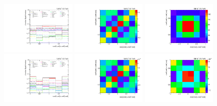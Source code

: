 \begin{figure}[htb]
\begin{center}
 \includegraphics[width=0.32\textwidth]{fig_fullRun2UL/unfolding/combined/deltaSystCombinedlog_rebinnedB_c_Pnk.pdf}
 \includegraphics[width=0.32\textwidth]{fig_fullRun2UL/unfolding/combined/StatCovMatrix_rebinnedB_c_Pnk.pdf}
 \includegraphics[width=0.32\textwidth]{fig_fullRun2UL/unfolding/combined/TotalSystCovMatrix_rebinnedB_c_Pnk.pdf} \\
 \includegraphics[width=0.32\textwidth]{fig_fullRun2UL/unfolding/combined/deltaSystCombinedlogNorm_rebinnedB_c_Pnk.pdf}
 \includegraphics[width=0.32\textwidth]{fig_fullRun2UL/unfolding/combined/StatCovMatrixNorm_rebinnedB_c_Pnk.pdf}
 \includegraphics[width=0.32\textwidth]{fig_fullRun2UL/unfolding/combined/TotalSystCovMatrixNorm_rebinnedB_c_Pnk.pdf} \\

\end{center}
\end{figure}
